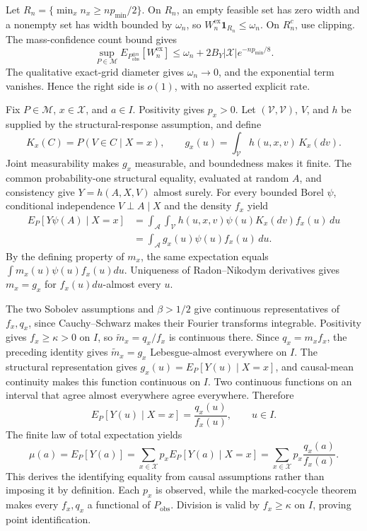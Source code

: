 Let \(R_n=\{\min_xn_x\ge np_{\min}/2\}\). On \(R_n\), an empty feasible set has zero width and a nonempty set has width bounded by \(\omega_n\), so \(W_n^{\mathrm{ex}}\mathbf1_{R_n}\le\omega_n\). On \(R_n^c\), use clipping. The mass-confidence count bound gives
\[
 \sup_{P\in\mathcal M}E_{P_{\mathrm{obs}}^{\otimes n}}[W_n^{\mathrm{ex}}]
 \le\omega_n+2B_Y|\mathcal X|e^{-np_{\min}/8}.
\]
The qualitative exact-grid diameter gives \(\omega_n\to0\), and the exponential term vanishes. Hence the right side is \(o(1)\), with no asserted explicit rate.

Fix \(P\in\mathcal M\), \(x\in\mathcal X\), and \(a\in I\). Positivity gives \(p_x>0\). Let \((\mathcal V,\mathscr V)\), \(V\), and \(h\) be supplied by the structural-response assumption, and define
\[
 K_x(C)=P(V\in C\mid X=x),
 \qquad
 g_x(u)=\int_{\mathcal V}h(u,x,v)\,K_x(dv).
\]
Joint measurability makes \(g_x\) measurable, and boundedness makes it finite. The common probability-one structural equality, evaluated at random \(A\), and consistency give \(Y=h(A,X,V)\) almost surely. For every bounded Borel \(\psi\), conditional independence \(V\perp A\mid X\) and the density \(f_x\) yield
\[
 \begin{aligned}
 E_P[Y\psi(A)\mid X=x]
 &=\int_{\mathcal A}\int_{\mathcal V}h(u,x,v)\psi(u)K_x(dv)f_x(u)\,du\\
 &=\int_{\mathcal A}g_x(u)\psi(u)f_x(u)\,du.
 \end{aligned}
\]
By the defining property of \(m_x\), the same expectation equals \(\int m_x(u)\psi(u)f_x(u)du\). Uniqueness of Radon--Nikodym derivatives gives \(m_x=g_x\) for \(f_x(u)du\)-almost every \(u\).

The two Sobolev assumptions and \(\beta>1/2\) give continuous representatives of \(f_x,q_x\), since Cauchy--Schwarz makes their Fourier transforms integrable. Positivity gives \(f_x\ge\kappa>0\) on \(I\), so \(\widetilde m_x=q_x/f_x\) is continuous there. Since \(q_x=m_xf_x\), the preceding identity gives \(\widetilde m_x=g_x\) Lebesgue-almost everywhere on \(I\). The structural representation gives \(g_x(u)=E_P[Y(u)\mid X=x]\), and causal-mean continuity makes this function continuous on \(I\). Two continuous functions on an interval that agree almost everywhere agree everywhere. Therefore
\[
 E_P[Y(u)\mid X=x]=\frac{q_x(u)}{f_x(u)},\qquad u\in I.
\]
The finite law of total expectation yields
\[
 \mu(a)=E_P[Y(a)]
 =\sum_{x\in\mathcal X}p_xE_P[Y(a)\mid X=x]
 =\sum_{x\in\mathcal X}p_x\frac{q_x(a)}{f_x(a)}.
\]
This derives the identifying equality from causal assumptions rather than imposing it by definition. Each \(p_x\) is observed, while the marked-cocycle theorem makes every \(f_x,q_x\) a functional of \(P_{\mathrm{obs}}\). Division is valid by \(f_x\ge\kappa\) on \(I\), proving point identification.

